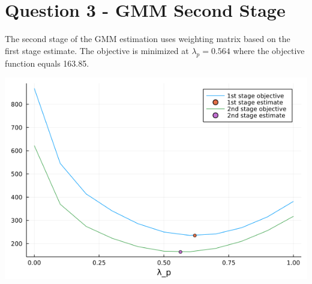 \documentclass{article}
\begin{document}
\pagebreak

\section*{Question 3 - GMM Second Stage}

The second stage of the GMM estimation uses weighting matrix based on the first stage estimate.  The objective is minimized at $\lambda_p = 0.564$ where the objective function equals 163.85.

\includegraphics[scale=.75]{question_3.png}
\end{document}
